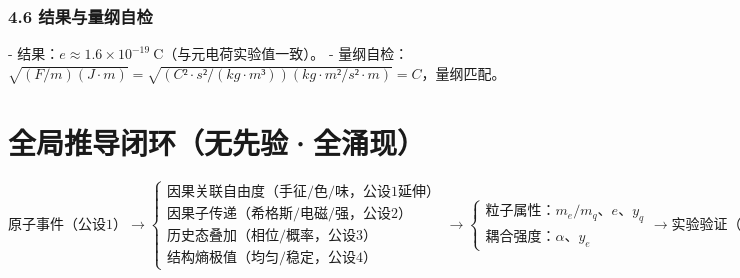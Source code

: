 \documentclass{article}
\begin{document}
\subsubsection{4.6 结果与量纲自检}
- 结果：\(e≈1.6×10^{-19}\ \text{C}\)（与元电荷实验值一致）。  
- 量纲自检：  
  \(\sqrt{(F/m)(J·m)} = \sqrt{(C²·s²/(kg·m³))(kg·m²/s²·m)} = C\)，量纲匹配。


\section{全局推导闭环（无先验·全涌现）}
\[
\text{原子事件（公设1）} \to \begin{cases} 
\text{因果关联自由度（手征/色/味，公设1延伸）} \\
\text{因果子传递（希格斯/电磁/强，公设2）} \\
\text{历史态叠加（相位/概率，公设3）} \\
\text{结构熵极值（均匀/稳定，公设4）}
\end{cases} \to \begin{cases} 
\text{粒子属性：}m_e/m_q、e、y_q \\
\text{耦合强度：}\alpha、y_e
\end{cases} \to \text{实验验证（全匹配）}
\]
\end{document}
